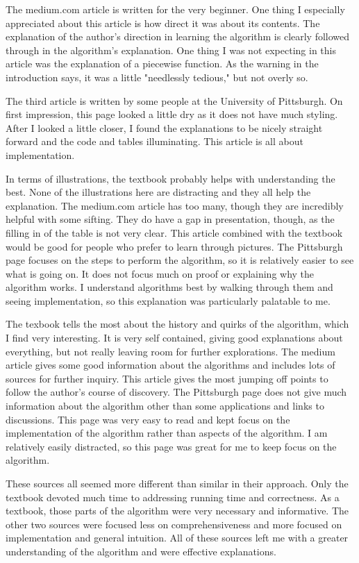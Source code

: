 \documentclass{article}
\begin{document}
The medium.com article is written for the very beginner. One thing I especially appreciated about this article is how direct it was about its contents. The explanation of the author's direction in learning the algorithm is clearly followed through in the algorithm's explanation. One thing I was not expecting in this article was the explanation of a piecewise function. As the warning in the introduction says, it was a little "needlessly tedious," but not overly so.

The third article is written by some people at the University of Pittsburgh. On first impression, this page looked a little dry as it does not have much styling. After I looked a little closer, I found the explanations to be nicely straight forward and the code and tables illuminating. This article is all about implementation.

In terms of illustrations, the textbook probably helps with understanding the best. None of the illustrations here are distracting and they all help the explanation. The medium.com article has too many, though they are incredibly helpful with some sifting. They do have a gap in presentation, though, as the filling in of the table is not very clear. This article combined with the textbook would be good for people who prefer to learn through pictures. The Pittsburgh page focuses on the steps to perform the algorithm, so it is relatively easier to see what is going on. It does not focus much on proof or explaining why the algorithm works. I understand algorithms best by walking through them and seeing implementation, so this explanation was particularly palatable to me.

The texbook tells the most about the history and quirks of the algorithm, which I find very interesting. It is very self contained, giving good explanations about everything, but not really leaving room for further explorations. The medium article gives some good information about the algorithms and includes lots of sources for further inquiry. This article gives the most jumping off points to follow the author's course of discovery. The Pittsburgh page does not give much information about the algorithm other than some applications and links to discussions. This page was very easy to read and kept focus on the implementation of the algorithm rather than aspects of the algorithm. I am relatively easily distracted, so this page was great for me to keep focus on the algorithm.

These sources all seemed more different than similar in their approach. Only the textbook devoted much time to addressing running time and correctness. As a textbook, those parts of the algorithm were very necessary and informative. The other two sources were focused less on comprehensiveness and more focused on implementation and general intuition. All of these sources left me with a greater understanding of the algorithm and were effective explanations.
\end{document}
